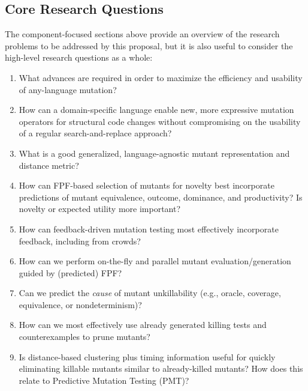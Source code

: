 \subsection{Core Research Questions}

The component-focused sections above provide an overview of the
research problems to be addressed by this proposal, but it is also
useful to consider the high-level research questions as a whole:


\begin{enumerate}[labelsep=3pt,leftmargin=12pt]
\item What advances are required in order to maximize the efficiency
  and usability of any-language mutation?
\item How can a domain-specific language
enable new, more expressive mutation operators for
structural code changes
without compromising on the usability of a %
regular
search-and-replace approach?
\item What is a good generalized, language-agnostic mutant representation
  and distance metric?
\item How can FPF-based selection of mutants for novelty best incorporate
  predictions of mutant equivalence, outcome, dominance, and
  productivity?  Is novelty or expected utility more important?
\item How can feedback-driven mutation testing most effectively
  incorporate feedback, including from crowds?
\item How can we perform on-the-fly and parallel mutant evaluation/generation guided by
  (predicted) FPF?
\item Can we predict the \emph{cause} of mutant
  unkillability (e.g., oracle, coverage, equivalence, or nondeterminism)?
\item How can  we most effectively use already generated killing tests
  and counterexamples to prune mutants?
\item Is distance-based clustering plus timing information useful for quickly
  eliminating killable mutants similar to already-killed mutants?  How
  does this relate to Predictive Mutation Testing (PMT)?

\end{enumerate}


